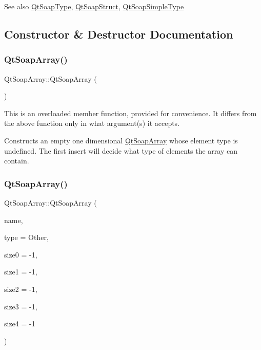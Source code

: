 \begin{DoxySeeAlso}{See also}
\mbox{\hyperlink{class_qt_soap_type}{Qt\+Soap\+Type}}, \mbox{\hyperlink{class_qt_soap_struct}{Qt\+Soap\+Struct}}, \mbox{\hyperlink{class_qt_soap_simple_type}{Qt\+Soap\+Simple\+Type}} 
\end{DoxySeeAlso}


\subsection{Constructor \& Destructor Documentation}
\mbox{\label{class_qt_soap_array_acae4791726c00ea165d0a2e0d91ef6e8}} 
\subsubsection{\texorpdfstring{Qt\+Soap\+Array()}{QtSoapArray()}\hspace{0.1cm}{\footnotesize\ttfamily [1/3]}}
{\footnotesize\ttfamily Qt\+Soap\+Array\+::\+Qt\+Soap\+Array (\begin{DoxyParamCaption}{ }\end{DoxyParamCaption})}

This is an overloaded member function, provided for convenience. It differs from the above function only in what argument(s) it accepts.

Constructs an empty one dimensional \mbox{\hyperlink{class_qt_soap_array}{Qt\+Soap\+Array}} whose element type is undefined. The first insert will decide what type of elements the array can contain. \mbox{\label{class_qt_soap_array_a4f29a3025733877fa2c04f8d705c2a8b}} 
\subsubsection{\texorpdfstring{Qt\+Soap\+Array()}{QtSoapArray()}\hspace{0.1cm}{\footnotesize\ttfamily [2/3]}}
{\footnotesize\ttfamily Qt\+Soap\+Array\+::\+Qt\+Soap\+Array (\begin{DoxyParamCaption}\item[{const \mbox{\hyperlink{class_qt_soap_q_name}{Qt\+Soap\+Q\+Name}} \&}]{name,  }\item[{\mbox{\hyperlink{class_qt_soap_type_a840b69f1d92eeb4e64ae1e0439d54683}{Qt\+Soap\+Type\+::\+Type}}}]{type = {\ttfamily Other},  }\item[{int}]{size0 = {\ttfamily -\/1},  }\item[{int}]{size1 = {\ttfamily -\/1},  }\item[{int}]{size2 = {\ttfamily -\/1},  }\item[{int}]{size3 = {\ttfamily -\/1},  }\item[{int}]{size4 = {\ttfamily -\/1} }\end{DoxyParamCaption})}


